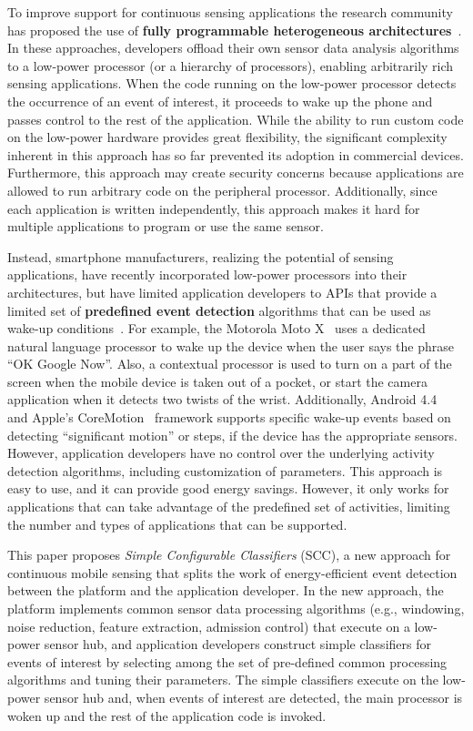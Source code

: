 To improve support for continuous sensing applications the research
community has proposed the use of {\bf fully progra\-mmable heterogeneous
architectures}~\cite{reflex,littlerock,turducken}.  In these
approaches, developers offload their own sensor data analysis 
algorithms to a low-power processor (or a hierarchy of processors), 
enabling arbitrarily rich sensing applications.  When the code running 
on the low-power processor detects the occurrence of an event of 
interest, it proceeds to wake up the phone and passes control to the 
rest of the application.  While the ability to run custom code on the 
low-power hardware provides great flexibility, the significant complexity
inherent in this approach has so far prevented its adoption in
commercial devices.  Furthermore, this approach may create security concerns
because applications are allowed to run arbitrary code on the
peripheral processor.  Additionally, since each application is written independently,
this approach makes it hard for multiple applications to program or
use the same sensor.  

Instead, smartphone manufacturers, realizing the
potential of sensing applications, have recently incorporated
low-power processors into their architectures, but have limited
application developers to APIs that provide a limited set of 
{\bf predefined event detection} algorithms that can be used as wake-up
conditions~\cite{androidMotionSensors,coreMotion}.  For example, 
the Motorola Moto X~\cite{motox,x8mobile} uses a dedicated natural language processor
to wake up the device when the user says the phrase ``OK Google Now''.  Also, 
a contextual processor is used to turn on a part of the screen
when the mobile device is taken out of a pocket, or start the camera
application when it detects two twists of the wrist.  Additionally, 
Android 4.4~\cite{android4.4} and Apple's CoreMotion~\cite{coreMotion} 
framework supports specific wake-up
events based on detecting ``significant motion'' or steps, if the device
has the appropriate sensors.  However, application developers have no
control over the underlying activity detection algorithms, including
customization of parameters.  This approach is easy to use, and it
can provide good energy savings.  However, it only works for applications that
can take advantage of the predefined set of activities, limiting the
number and types of applications that can be supported.

This paper proposes {\em Simple Configurable Classifiers} (SCC), a new
approach for continuous mobile sensing that splits the work of
energy-efficient event detection between the platform and the
application developer.  In the new approach, the platform implements
common sensor data processing algorithms (e.g., windowing, noise 
reduction, feature extraction, admission control) that execute on a 
low-power sensor hub, and application developers construct simple 
classifiers for events of interest by selecting among the set of
pre-defined common processing algorithms and tuning their
parameters.  The simple classifiers execute on the
low-power sensor hub and, when events of interest are detected, the
main processor is woken up and the rest of the application code is
invoked.
  
